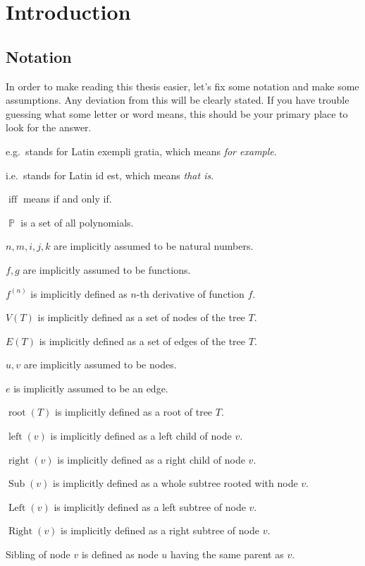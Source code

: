 \documentclass[final]{article}
\theoremstyle{definition}
\theoremstyle{definition}
\theoremstyle{remark}
\DeclareMathOperator{\textiff}{\text{iff}}
\DeclareMathOperator{\poly}{\mathbb{P}}
\DeclareMathOperator{\troot}{\text{root}}
\DeclareMathOperator{\tleft}{\text{left}}
\DeclareMathOperator{\tright}{\text{right}}
\DeclareMathOperator{\tLeft}{\text{Left}}
\DeclareMathOperator{\tRight}{\text{Right}}
\DeclareMathOperator{\tSub}{\text{Sub}}
\begin{document}
\clearpage

\section{Introduction}%
\label{sec:introduction}

\subsection{Notation}%
\label{sub:notation}

In order to make reading this thesis easier, let's fix some notation and make some assumptions. Any deviation from this will be clearly stated. If you have trouble guessing what some letter or word means, this should be your primary place to look for the answer.

e.g.\ stands for Latin exempli gratia, which means \textit{for example}.

i.e.\ stands for Latin id est, which means \textit{that is}.

\(\textiff\) means if and only if.

\(\poly\) is a set of all polynomials.

\(n, m, i, j, k\) are implicitly assumed to be natural numbers.

\(f, g\) are implicitly assumed to be functions.

\(f^{(n)}\) is implicitly defined as \(n\)-th derivative of function \(f\).

\(V(T)\) is implicitly defined as a set of nodes of the tree \(T\).

\(E(T)\) is implicitly defined as a set of edges of the tree \(T\).

\(u, v\) are implicitly assumed to be nodes.

\(e\) is implicitly assumed to be an edge.

\(\troot(T)\) is implicitly defined as a root of tree \(T\).

\(\tleft(v)\) is implicitly defined as a left child of node \(v\).

\(\tright(v)\) is implicitly defined as a right child of node \(v\).

\(\tSub(v)\) is implicitly defined as a whole subtree rooted with node \(v\).

\(\tLeft(v)\) is implicitly defined as a left subtree of node \(v\).

\(\tRight(v)\) is implicitly defined as a right subtree of node \(v\).

Sibling of node \(v\) is defined as node \(u\) having the same parent as \(v\).
\end{document}
